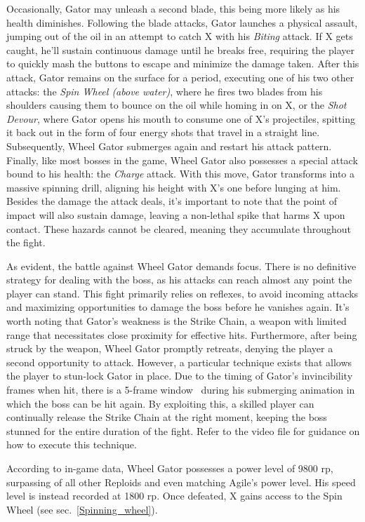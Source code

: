 Occasionally, Gator may unleash a second blade, this being more likely as his health diminishes. Following the blade attacks, Gator launches a physical assault, jumping out of the oil in an attempt to catch X with his \emph{Biting} attack. If X gets caught, he'll sustain continuous damage until he breaks free, requiring the player to quickly mash the buttons to escape and minimize the damage taken. After this attack, Gator remains on the surface for a period, executing one of his two other attacks: the \emph{Spin Wheel (above water)}, where he fires two blades from his shoulders causing them to bounce on the oil while homing in on X, or the \emph{Shot Devour}, where Gator opens his mouth to consume one of X's projectiles, spitting it back out in the form of four energy shots that travel in a straight line. Subsequently, Wheel Gator submerges again and restart his attack pattern. Finally, like most bosses in the game, Wheel Gator also possesses a special attack bound to his health: the \emph{Charge} attack. With this move, Gator transforms into a massive spinning drill, aligning his height with X's one before lunging at him. Besides the damage the attack deals, it's important to note that the point of impact will also sustain damage, leaving a non-lethal spike that harms X upon contact. These hazards cannot be cleared, meaning they accumulate throughout the fight.


As evident, the battle against Wheel Gator demands focus. There is no definitive strategy for dealing with the boss, as his attacks can reach almost any point the player can stand. This fight primarily relies on reflexes, to avoid incoming attacks and maximizing opportunities to damage the boss before he vanishes again. 
It's worth noting that Gator's weakness is the Strike Chain, a weapon with limited range that necessitates close proximity for effective hits. Furthermore, after being struck by the weapon, Wheel Gator promptly retreats, denying the player a second opportunity to attack. However, a particular technique exists that allows the player to stun-lock Gator in place. Due to the timing of Gator's invincibility frames when hit, there is a 5-frame window~\cite{rta:x2} during his submerging animation in which the boss can be hit again. By exploiting this, a skilled player can continually release the Strike Chain at the right moment, keeping the boss stunned for the entire duration of the fight. Refer to the video file  for guidance on how to execute this technique.

According to in-game data, Wheel Gator possesses a power level of 9800 rp, surpassing  of all other Reploids and even matching Agile's power level. His speed level is instead recorded at 1800 rp. Once defeated, X gains access to the Spin Wheel (see sec.~\ref{Spinning_wheel}). 


